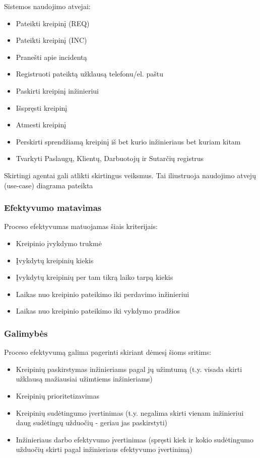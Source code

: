 			Sistemos naudojimo atvejai:
			\begin{itemize}
				\item Pateikti kreipinį (REQ)
				\item Pateikti kreipinį (INC)
				\item Pranešti apie incidentą
				\item Registruoti pateiktą užklausą telefonu/el. paštu
				\item Paskirti kreipinį inžinieriui
				\item Išspręsti kreipinį
				\item Atmesti kreipinį
				\item Perskirti sprendžiamą kreipinį iš bet kurio inžinieriaus bet kuriam kitam
				\item Tvarkyti Paslaugų, Klientų, Darbuotojų ir Sutarčių registrus
			\end{itemize}
			
			Skirtingi agentai gali atlikti skirtingus veiksmus.
			Tai iliustruoja naudojimo atvejų (use-case) diagrama pateikta 


		\subsubsection{Efektyvumo matavimas}
		
			Proceso efektyvumas matuojamas šiais kriterijais:
			\begin{itemize}
				\item Kreipinio įvykdymo trukmė
				\item Įvykdytų kreipinių kiekis
				\item Įvykdytų kreipinių per tam tikrą laiko tarpą kiekis
				\item Laikas nuo kreipinio pateikimo iki perdavimo inžinieriui
				\item Laikas nuo kreipinio pateikimo iki vykdymo pradžios 
			\end{itemize}
			
		\subsubsection{Galimybės}

			Proceso efektyvumą galima pagerinti skiriant dėmesį šioms sritims:
			\begin{itemize}
				\item Kreipinių paskirstymas inžinieriams pagal jų užimtumą
				(t.y. visada skirti užklausą mažiausiai užimtiems inžinieriams)
				\item Kreipinių prioritetizavimas
				\item Kreipinių sudėtingumo įvertinimas
				(t.y. negalima skirti vienam inžinieriui daug sudėtingų užduočių - geriau jas paskirstyti)
				\item Inžinieriaus darbo efektyvumo įvertinimas
				(spręsti kiek ir kokio sudėtingumo užduočių skirti pagal inžinieriaus efektyvumo įvertinimą)
			\end{itemize}


